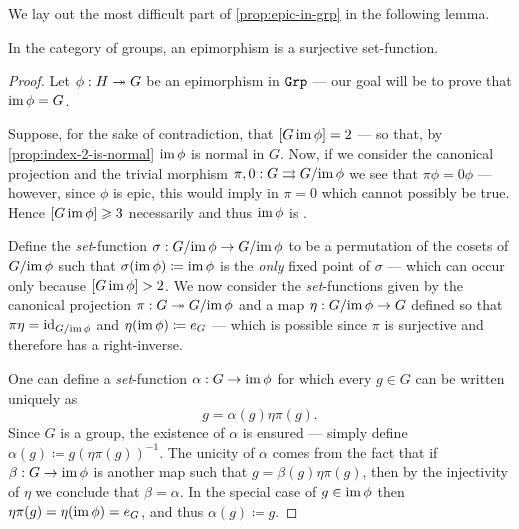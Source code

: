 We lay out the most difficult part of \cref{prop:epic-in-grp} in the following
lemma.

\begin{lemma}
\label{lem:epimorphism-is-surjective-grp}
In the category of groups, an epimorphism is a surjective set-function.
\end{lemma}

\begin{proof}
Let \(\phi: H \twoheadrightarrow G\) be an epimorphism in \({\texttt{Grp}}\) --- our goal will be to
prove that \(\operatorname{im} \phi = G\).

Suppose, for the sake of contradiction, that \([G \relax \operatorname{im} \phi] = 2\) --- so
that, by \cref{prop:index-2-is-normal} \(\operatorname{im} \phi\) is normal in \(G\). Now, if
we consider the canonical projection and the trivial morphism
\(\pi, 0: G \rightrightarrows G/{\operatorname{im} \phi}\) we see that \(\pi \phi = 0 \phi\)
--- however, since \(\phi\) is epic, this would imply in \(\pi = 0\) which
cannot possibly be true. Hence \([G \relax \operatorname{im} \phi] \geqslant 3\) necessarily and
thus \(\operatorname{im} \phi\) is .

Define the \emph{set}-function \(\sigma: G/{\operatorname{im} \phi} \to G/{\operatorname{im} \phi}\) to be a
permutation of the cosets of \(G/{\operatorname{im} \phi}\) such that
\(\sigma(\operatorname{im} \phi) \coloneq \operatorname{im} \phi\) is the \emph{only} fixed point of
\(\sigma\) --- which can occur only because \([G \relax \operatorname{im} \phi] > 2\). We now
consider the \emph{set}-functions given by the canonical projection
\(\pi: G \twoheadrightarrow G/{\operatorname{im} \phi}\) and a map \(\eta: G/{\operatorname{im} \phi} \to G\) defined so
that \(\pi \eta = \operatorname{id}_{G/{\operatorname{im} \phi}}\) and \(\eta(\operatorname{im} \phi) \coloneq e_G\) ---
which is possible since \(\pi\) is surjective and therefore has a right-inverse.

One can define a \emph{set}-function \(\alpha: G \to \operatorname{im} \phi\) for which every
\(g \in G\) can be written uniquely as
\begin{equation}\label{eq:write-uniquely-g}
  g = \alpha(g) \eta \pi(g).
\end{equation}
Since \(G\) is a group, the existence of \(\alpha\) is ensured --- simply define
\(\alpha(g) \coloneq g (\eta \pi(g))^{-1}\).  The unicity of \(\alpha\) comes
from the fact that if \(\beta: G \to \operatorname{im} \phi\) is another map such that
\(g = \beta(g) \eta \pi(g)\), then by the injectivity of \(\eta\) we conclude
that \(\beta = \alpha\). In the special case of \(g \in \operatorname{im} \phi\) then
\(\eta\pi(g) = \eta(\operatorname{im} \phi) = e_G\), and thus \(\alpha(g) \coloneq g\).


\end{proof}
